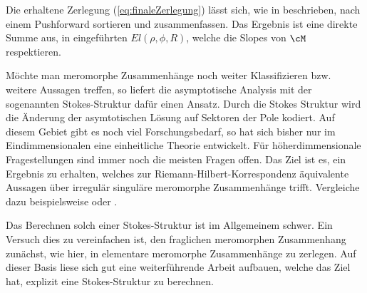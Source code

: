 \begin{comment}
Dies bestätigt die ohnehin bekannte Aussage, dass in unserem Beispiel keine
konvergente Zerlegung zu finden ist.
\end{comment}

Die erhaltene Zerlegung (\ref{eq:finaleZerlegung}) lässt sich, wie in
\cite[Cor 3.3]{sabbah_Fourier-local} beschrieben, nach einem Pushforward
sortieren und zusammenfassen. Das Ergebnis ist eine direkte Summe aus, in
\cite{sabbah_Fourier-local} eingeführten $El(\rho,\phi,R)$, welche die Slopes
von $\cM$ \glqq{}respektieren\grqq{}.

Möchte man meromorphe Zusammenhänge noch weiter Klassifizieren bzw. weitere
Aussagen treffen, so liefert die asymptotische Analysis mit der sogenannten
Stokes-Struktur dafür einen Ansatz.
Durch die Stokes Struktur wird die Änderung der asymtotischen Lösung auf
Sektoren der Pole kodiert.
Auf diesem Gebiet gibt es noch viel Forschungsbedarf, so hat sich bisher nur im
Eindimmensionalen eine einheitliche Theorie entwickelt. Für höherdimmensionale
Fragestellungen sind immer noch die meisten Fragen offen.
Das Ziel ist es, ein Ergebnis zu erhalten, welches zur
Riemann-Hilbert-Korrespondenz äquivalente Aussagen über irregulär singuläre
meromorphe Zusammenhänge trifft.
Vergleiche dazu beispielsweise \cite{sabbah2013introduction} oder
\cite{citeulike:8523004}.

Das Berechnen solch einer Stokes-Struktur ist im Allgemeinem schwer.
Ein Versuch dies zu vereinfachen ist, den fraglichen meromorphen Zusammenhang
zunächst, wie hier, in elementare meromorphe Zusammenhänge zu zerlegen.
Auf dieser Basis liese sich gut eine weiterführende Arbeit aufbauen, welche
das Ziel hat, explizit eine Stokes-Struktur zu berechnen.

\begin{comment}
Stokes Struktur ausrechen? Dazu die Lösung asymptotisch approximieren
$\rightsquigarrow$ offensichtlich schwer\\
deshalb suche andere Lösung
\end{comment}
\begin{comment}
Als nächstes könnte man die Stokes Struktur des zerlegten meromorphen
Zusammenhangs zu berechnen.
Dazu möchte man die Lösungen der einzelnen Summanden asymptotisch
approximieren. 
\end{comment}

